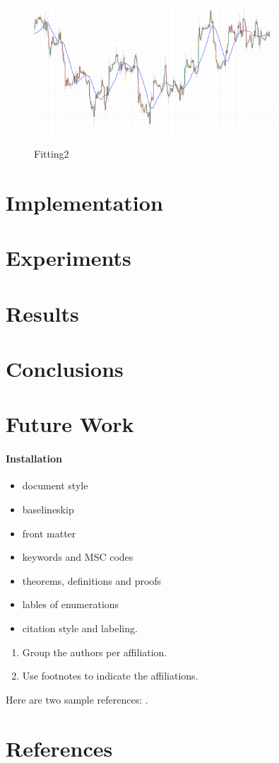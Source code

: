 \documentclass[review]{elsarticle}
\begin{document}
\begin{figure}
\caption{Fitting2}
\centering
\includegraphics[width=0.8\textwidth]{img/fitting2.png}
\label{figure:fitting2}
\end{figure}

\section{Implementation}
\label{section:implementation}

\section{Experiments}
\label{section:experiments}

\section{Results}
\label{section:results}

\section{Conclusions}
\label{section:conclusions}

\section{Future Work}
\label{section:future-work}

\paragraph{Installation}

\begin{itemize}
\item document style
\item baselineskip
\item front matter
\item keywords and MSC codes
\item theorems, definitions and proofs
\item lables of enumerations
\item citation style and labeling.
\end{itemize}

\begin{enumerate}[(1)]
\item Group the authors per affiliation.
\item Use footnotes to indicate the affiliations.
\end{enumerate}

Here are two sample references: \cite{Feynman1963118,Dirac1953888}.

\section*{References}


\end{document}

